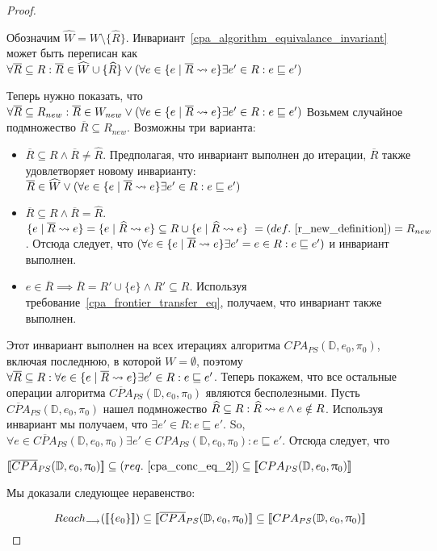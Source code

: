 \begin{proof}
\begin{enumerate}
\begin{itemize}
Обозначим $\widehat{W} = W \setminus \{\widehat{R}\}$. Инвариант~\ref{cpa_algorithm_equivalance_invariant} может быть переписан как
$\forall \overline{R} \subseteq R: \overline{R} \in \widehat{W} \cup \{\widehat{R}\} \lor (\forall e \in \{e \mid \overline{R} \leadsto e\} \exists e' \in R : e \sqsubseteq e') $

Теперь нужно показать, что
$\forall \overline{R} \subseteq R_{new}: \overline{R} \in W_{new} \lor(\forall e \in \{e \mid \overline{R} \leadsto e\} \exists e' \in R : e \sqsubseteq e') $
Возьмем случайное подмножество $\overline{R} \subseteq R_{new}$. Возможны три варианта:
\begin{itemize}
\item $\overline{R} \subseteq R \land \overline{R} \neq \widehat{R}$.
Предполагая, что инвариант выполнен до итерации, $\overline{R}$ также удовлетворяет новому инварианту: $\overline{R} \in \widehat{W} \lor (\forall e \in \{e \mid \overline{R} \leadsto e\} \exists e' \in R : e \sqsubseteq e') $

\item $\overline{R} \subseteq R \land \overline{R} = \widehat{R}$. $\{e \mid \overline{R} \leadsto e\}  = \{e \mid \widehat{R} \leadsto e\} \subseteq R \cup \{e \mid \widehat{R} \leadsto e\} \ = (def.~\ref{r_new_definition}) = R_{new}$. Отсюда следует, что $(\forall e \in \{e \mid \overline{R} \leadsto e\} \exists e' = e \in R : e \sqsubseteq e')$ и инвариант выполнен.

\item $e \in \overline{R} \implies \overline{R} = R' \cup \{e\} \land R' \subseteq R$. Используя требование~\ref{cpa_frontier_transfer_eq}, получаем, что инвариант также выполнен.
\end{itemize}

Этот инвариант выполнен на всех итерациях алгоритма $CPA_{PS}(\mathbb{D}, e_0, \pi_0)$, включая последнюю, в которой $W = \emptyset$, поэтому $\forall \overline{R} \subseteq R: \forall e \in \{e \mid \overline{R} \leadsto e\} \exists e' \in R : e \sqsubseteq e'$.
Теперь покажем, что все остальные операции алгоритма $\overline{CPA}_{PS}(\mathbb{D}, e_0, \pi_0)$ являются бесполезными.
Пусть $\overline{CPA}_{PS}(\mathbb{D}, e_0, \pi_0)$ нашел подмножество $\widehat{R} \subseteq R: \widehat{R} \leadsto e \land e \notin R$.
Используя инвариант мы получаем, что $\exists e' \in R: e \sqsubseteq e'$. So, $\forall e \in \overline{CPA}_{PS}(\mathbb{D}, e_0, \pi_0) \exists e' \in CPA_{PS}(\mathbb{D}, e_0, \pi_0): e \sqsubseteq e'$.
Отсюда следует, что

$[\![ \overline{CPA}_{PS}(\mathbb{D}, e_0, \uppi_0) ]\!] \subseteq (req.~\ref{cpa_conc_eq_2}) \subseteq [\![ CPA_{PS}(\mathbb{D}, e_0, \uppi_0) ]\!]$

\end{itemize}

\end{enumerate}
Мы доказали следующее неравенство:

$$Reach_{\longrightarrow}([\![ \{e_0\} ]\!]) \subseteq [\![ \overline{CPA}_{PS}(\mathbb{D}, e_0, \uppi_0) ]\!] \subseteq [\![ CPA_{PS}(\mathbb{D}, e_0, \uppi_0) ]\!]$$

\qedsymbol
\end{proof}

